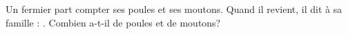 \documentclass[exercice]{thedocument}%
\begin{document}
%
Un fermier part compter ses poules et ses moutons. Quand il revient, il dit à
sa famille : .
\vskip5pt\noindent Combien a-t-il de poules et de moutons?
\end{document}
